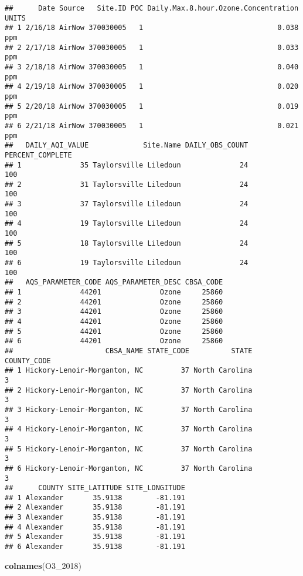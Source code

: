 \documentclass[]{article}
\newenvironment{Shaded}{\begin{snugshade}}{\end{snugshade}}
\newcommand{\KeywordTok}[1]{\textcolor[rgb]{0.13,0.29,0.53}{\textbf{#1}}}
\newcommand{\DecValTok}[1]{\textcolor[rgb]{0.00,0.00,0.81}{#1}}
\newcommand{\NormalTok}[1]{#1}
\begin{document}
\begin{verbatim}
##      Date Source   Site.ID POC Daily.Max.8.hour.Ozone.Concentration UNITS
## 1 2/16/18 AirNow 370030005   1                                0.038   ppm
## 2 2/17/18 AirNow 370030005   1                                0.033   ppm
## 3 2/18/18 AirNow 370030005   1                                0.040   ppm
## 4 2/19/18 AirNow 370030005   1                                0.020   ppm
## 5 2/20/18 AirNow 370030005   1                                0.019   ppm
## 6 2/21/18 AirNow 370030005   1                                0.021   ppm
##   DAILY_AQI_VALUE             Site.Name DAILY_OBS_COUNT PERCENT_COMPLETE
## 1              35 Taylorsville Liledoun              24              100
## 2              31 Taylorsville Liledoun              24              100
## 3              37 Taylorsville Liledoun              24              100
## 4              19 Taylorsville Liledoun              24              100
## 5              18 Taylorsville Liledoun              24              100
## 6              19 Taylorsville Liledoun              24              100
##   AQS_PARAMETER_CODE AQS_PARAMETER_DESC CBSA_CODE
## 1              44201              Ozone     25860
## 2              44201              Ozone     25860
## 3              44201              Ozone     25860
## 4              44201              Ozone     25860
## 5              44201              Ozone     25860
## 6              44201              Ozone     25860
##                      CBSA_NAME STATE_CODE          STATE COUNTY_CODE
## 1 Hickory-Lenoir-Morganton, NC         37 North Carolina           3
## 2 Hickory-Lenoir-Morganton, NC         37 North Carolina           3
## 3 Hickory-Lenoir-Morganton, NC         37 North Carolina           3
## 4 Hickory-Lenoir-Morganton, NC         37 North Carolina           3
## 5 Hickory-Lenoir-Morganton, NC         37 North Carolina           3
## 6 Hickory-Lenoir-Morganton, NC         37 North Carolina           3
##      COUNTY SITE_LATITUDE SITE_LONGITUDE
## 1 Alexander       35.9138        -81.191
## 2 Alexander       35.9138        -81.191
## 3 Alexander       35.9138        -81.191
## 4 Alexander       35.9138        -81.191
## 5 Alexander       35.9138        -81.191
## 6 Alexander       35.9138        -81.191
\end{verbatim}

\begin{Shaded}
\begin{Highlighting}[]
\KeywordTok{colnames}\NormalTok{(O3_}\DecValTok{2018}\NormalTok{)}
\end{Highlighting}
\end{Shaded}
\end{document}

